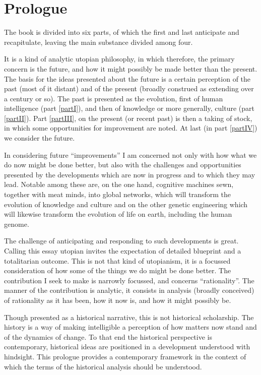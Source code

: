 
\mainmatter

\part{Prologue}\label{part0}


The book is divided into six parts, of which the first and last anticipate and recapitulate, leaving the main substance divided among four.

It is a kind of analytic utopian philosophy, in which therefore, the primary concern is the future, and how it might possibly be made better than the present.
The basis for the ideas presented about the future is a certain perception of the past (most of it distant) and of the present (broadly construed as extending over a century or so).
The past is presented as the evolution, first of human intelligence (part \ref{partI}), and then of knowledge or more generally, culture (part \ref{partII}).
Part \ref{partIII}, on the present (or recent past) is then a taking of stock, in which some opportunities for improvement are noted.
At last (in part \ref{partIV}) we consider the future.

In considering future ``improvements'' I am concerned not only with how what we do now might be done better, but also with the challenges and opportunities presented by the developments which are now in progress and to which they may lead.
Notable among these are, on the one hand, cognitive machines sewn, together with meat minds, into global networks, which will transform the evolution of knowledge and culture and on the other genetic engineering which will likewise transform the evolution of life on earth, including the human genome.

The challenge of anticipating and responding to such developments is great.
Calling this essay utopian invites the expectation of detailed blueprint and a totalitarian outcome.
This is not that kind of utopianism, it is a focussed consideration of how some of the things we do might be done better.
The contribution I seek to make is narrowly focussed, and concerns ``rationality''.
The manner of the contribution is analytic, it consists in analysis (broadly conceived) of rationality as it has been, how it now is, and how it might possibly be.

Though presented as a historical narrative, this is not historical scholarship.
The history is a way of making intelligible a perception of how matters now stand and of the dynamics of change.
To that end the historical perspective is contemporary, historical ideas are positioned in a development understood with hindsight.
This prologue provides a contemporary framework in the context of which the terms of the historical analysis should be understood.

